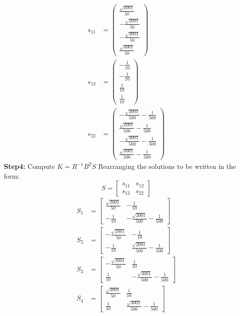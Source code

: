 \begin{align*}
	s_{11} &= \left(\begin{array}{c} \frac{\sqrt{2001}}{50}\\ -\frac{\sqrt{2001}}{50}\\ -\frac{\sqrt{3001}}{50}\\ \frac{\sqrt{3001}}{50} \end{array}\right) \\
	s_{12} &= \left(\begin{array}{c} -\frac{1}{10}\\ -\frac{1}{10}\\ \frac{1}{10}\\ \frac{1}{10} \end{array}\right) \\
	s_{22} &= \left(\begin{array}{c} -\frac{\sqrt{2001}}{500}-\frac{1}{500}\\ \frac{\sqrt{2001}}{500}-\frac{1}{500}\\ -\frac{\sqrt{3001}}{500}-\frac{1}{500}\\ \frac{\sqrt{3001}}{500}-\frac{1}{500} \end{array}\right)	
\end{align*}
\textbf{Step4: } Compute $K = R^{-1} B^{T} S$
Rearranging the solutions to be written in the form:
\begin{equation*}
	S = \begin{bmatrix}
		s_{11} & s_{12} \\ s_{12} & s_{22}
	\end{bmatrix}
\end{equation*}
\begin{align*}
	S_{1} &= \begin{bmatrix}
		\frac{\sqrt{2001}}{50} & -\frac{1}{10} \\ -\frac{1}{10} & -\frac{\sqrt{2001}}{500}-\frac{1}{500}
	\end{bmatrix}\\
	S_{2} &= \begin{bmatrix}
		-\frac{\sqrt{2001}}{50} & -\frac{1}{10} \\ -\frac{1}{10} & \frac{\sqrt{2001}}{500}-\frac{1}{500}
	\end{bmatrix} \\
	S_{3} &= \begin{bmatrix}
		-\frac{\sqrt{3001}}{50} & \frac{1}{10} \\ \frac{1}{10} & -\frac{\sqrt{3001}}{500}-\frac{1}{500}
	\end{bmatrix}\\
	S_{4} &= \begin{bmatrix}
		\frac{\sqrt{3001}}{50} & \frac{1}{10} \\ \frac{1}{10} & \frac{\sqrt{3001}}{500}-\frac{1}{500}
	\end{bmatrix}
\end{align*}
